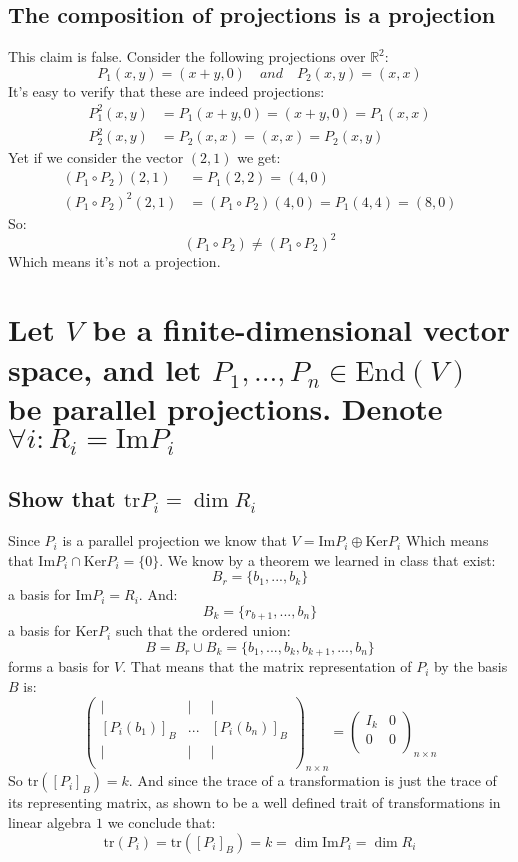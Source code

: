 \documentclass[11pt,a4paper]{article}
\theoremstyle{plain}
\newcommand{\Ker}{\text{Ker}}
\renewcommand{\Im}{\text{Im}}
\newcommand{\tr}{\text{tr}}
\newcommand{\R}{\mathbb{R}}
\begin{document}
	\subsection{The composition of projections is a projection}
	This claim is false. Consider the following projections over $\R^2$:
	\[
		P_1(x,y) = (x+y,0) \quad and \quad P_2(x,y) = (x,x)
	\]
	It's easy to verify that these are indeed projections:
	\begin{align*}
		P_1^2(x,y) &= P_1(x+y,0) = (x+y,0) = P_1(x,x) \\
		P_2^2(x,y) &= P_2(x,x) = (x,x) = P_2(x,y)
	\end{align*}
	Yet if we consider the vector $(2,1)$ we get:
	\begin{align*}
		(P_1\circ P_2)(2,1) &= P_1(2,2) = (4,0) \\
		(P_1\circ P_2)^2(2,1) &= (P_1\circ P_2)(4,0) = P_1(4,4) = (8,0)
	\end{align*}
	So:
	\[
		(P_1\circ P_2) \neq (P_1\circ P_2)^2
	\]
	Which means it's not a projection.
	
	
	
	\newpage
	
	\section{Let $V$ be a finite-dimensional vector space, and let
	$P_1,...,P_n\in \text{End}(V)$ be parallel projections. Denote $\forall i\colon R_i = \text{Im}P_i$}
	\subsection{Show that $\text{tr}P_i=\dim R_i$}
	Since $P_i$ is a parallel projection we know that 
	$V = \Im P_i \oplus \Ker P_i$
	Which means that $\Im P_i\cap \Ker P_i = \{0\}$. We know by a theorem
	we learned in class that exist:
	\[ B_r = \{b_1,...,b_k\} \]
	a basis for $\Im P_i = R_i$. And:
	\[ B_k = \{r_{b+1},...,b_n\} \]
	a basis for $\Ker P_i$ such that the ordered union:
	\[ B = B_r \cup B_k = \{b_1,...,b_k,b_{k+1},...,b_n\} \]
	forms a basis for $V$. That means that the matrix representation of $P_i$
	by the basis $B$ is:
	\[ 
	\begin{pmatrix}
	\vert & \vert & \vert\\
	[P_i(b_1)]_B & ... & [P_i(b_n)]_B\\
	\vert & \vert & \vert\\
	\end{pmatrix}_{n\times n}
	= 
	\begin{pmatrix}
	I_k & 0\\
	0 & 0\\
	\end{pmatrix}_{n\times n}
	\]
	So $\tr ([P_i]_B) = k$. And since the trace of a transformation is just
	the trace of its representing matrix, as shown to be a well defined trait
	of transformations  in linear algebra $1$ we conclude that:
	\[
		\tr (P_i) = \tr ([P_i]_B) = k = \dim\Im P_i = \dim R_i
	\]
\end{document}
